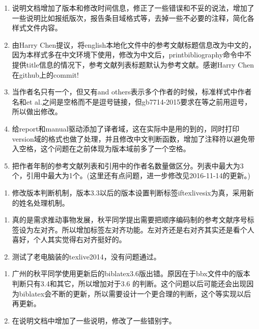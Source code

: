 \begin{enumerate}
\item 说明文档增加了版本和修改时间信息，修正了一些错误和不妥的说法，增加了一些说明比如报纸版次，报告条目域格式等，去掉一些不必要的注释，简化各样式文件内容。

\item 由Harry Chen提议，将english本地化文件中的参考文献标题信息改为中文的，因为本样式多在中文环境下使用，修改为中文后，printbibliography命令中不提供title信息的情况下，参考文献列表标题默认为参考文献。感谢Harry Chen在github上的commit!

\item 当作者名只有一个，但又有and others表示多个作者的时候，标准样式中作者名和et al.之间是空格而不是逗号链接，但gb7714-2015要求在等之前用逗号，所以做出修改。

\item 给report和manual驱动添加了译者域，这在实际中是用的到的，同时打印version域的格式也做了处理，并且修改中文判断函数，增加了注释符以避免带入空格，这个问题在之前体现为版本域前多了一个空格。


\item 把作者年制的参考文献列表和引用中的作者名数量做区分。列表中最大为3 个，引用中最大为1个。(这里还有点问题，进一步修改见2016-11-14的更新。)
\end{enumerate}

\begin{enumerate}
\item 修改版本判断机制，版本3.3以后的版本设置判断标签iftexlivesix为真，采用新的姓名处理机制。
\end{enumerate}

\begin{enumerate}
\item 真的是需求推动事物发展，秋平同学提出需要把顺序编码制的参考文献序号标签设为左对齐。所以增加标签左对齐功能。左对齐还是右对齐其实还是看个人喜好，个人其实觉得右对齐挺好的。

\item 测试了老电脑装的texlive2014，没有问题通过。
\end{enumerate}

\begin{enumerate}
\item 广州的秋平同学使用更新后的biblatex3.6版出错。原因在于bbx文件中的版本判断只有3.4和其它，所以增加对于3.6 的判断。这个问题以后可能还会出现因为biblatex会不断的更新，所以需要设计一个更合理的判断，这个等实现以后再更新。

\item 在说明文档中增加了一些说明，修改了一些错别字。
\end{enumerate}

